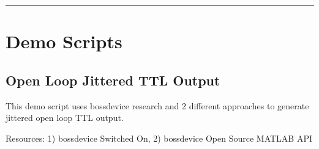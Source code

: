 \documentclass[letterpaper,10pt,english]{sphinxmanual}
\begin{document}
\bigskip\hrule\bigskip



\chapter{Demo Scripts}
\label{\detokenize{5_demo_scripts:demo-scripts}}\label{\detokenize{5_demo_scripts::doc}}

\section{Open Loop Jittered TTL Output}
\label{\detokenize{5_demo_scripts:open-loop-jittered-ttl-output}}
\sphinxAtStartPar
This demo script uses bossdevice research and 2 different approaches to generate jittered open loop TTL output.

\sphinxAtStartPar
Resources: 1) bossdevice Switched On, 2) bossdevice Open Source MATLAB API
\end{document}
